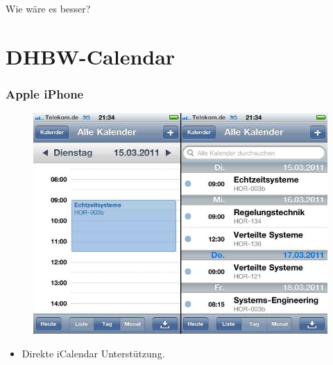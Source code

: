 \documentclass{beamer}
\begin{document}
\begin{frame}
  \begin{center}
    \Huge Wie wäre es besser?
  \end{center}
\end{frame}

\begin{frame}

\end{frame}


\section{DHBW-Calendar}
\begin{frame}\frametitle{Apple iPhone}
  \begin{figure}
    \centering
    \includegraphics[height=0.6\paperheight]{images/dhbwcalendar-iphone.jpg}
  \end{figure}
  \begin{itemize}
    \item Direkte iCalendar Unterstützung.
  \end{itemize}
\end{frame}
\end{document}
